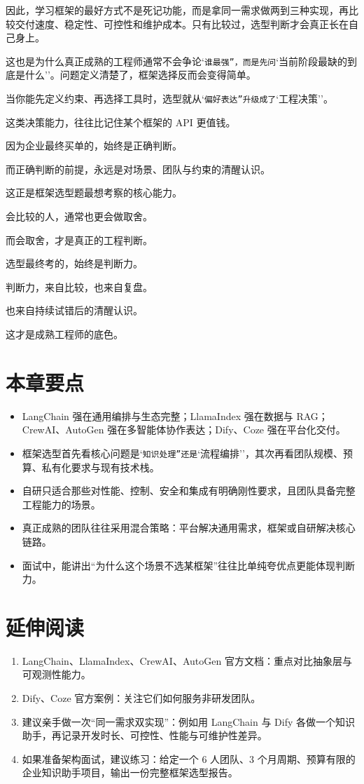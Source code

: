 因此，学习框架的最好方式不是死记功能，而是拿同一需求做两到三种实现，再比较交付速度、稳定性、可控性和维护成本。只有比较过，选型判断才会真正长在自己身上。


这也是为什么真正成熟的工程师通常不会争论`\texttt{谁最强''，而是先问}`当前阶段最缺的到底是什么''。问题定义清楚了，框架选择反而会变得简单。


当你能先定义约束、再选择工具时，选型就从`\texttt{偏好表达''升级成了}`工程决策''。


这类决策能力，往往比记住某个框架的 API 更值钱。


因为企业最终买单的，始终是正确判断。


而正确判断的前提，永远是对场景、团队与约束的清醒认识。


这正是框架选型题最想考察的核心能力。


会比较的人，通常也更会做取舍。


而会取舍，才是真正的工程判断。


选型最终考的，始终是判断力。


判断力，来自比较，也来自复盘。


也来自持续试错后的清醒认识。


这才是成熟工程师的底色。


\section{本章要点}

\begin{itemize}[leftmargin=2em]
\item LangChain 强在通用编排与生态完整；LlamaIndex 强在数据与 RAG；CrewAI、AutoGen 强在多智能体协作表达；Dify、Coze 强在平台化交付。
\item 框架选型首先看核心问题是`\texttt{知识处理''还是}`流程编排''，其次再看团队规模、预算、私有化要求与现有技术栈。
\item 自研只适合那些对性能、控制、安全和集成有明确刚性要求，且团队具备完整工程能力的场景。
\item 真正成熟的团队往往采用混合策略：平台解决通用需求，框架或自研解决核心链路。
\item 面试中，能讲出``为什么这个场景不选某框架''往往比单纯夸优点更能体现判断力。
\end{itemize}

\section{延伸阅读}

\begin{enumerate}[leftmargin=2em]
\item LangChain、LlamaIndex、CrewAI、AutoGen 官方文档：重点对比抽象层与可观测性能力。
\item Dify、Coze 官方案例：关注它们如何服务非研发团队。
\item 建议亲手做一次``同一需求双实现''：例如用 LangChain 与 Dify 各做一个知识助手，再记录开发时长、可控性、性能与可维护性差异。
\item 如果准备架构面试，建议练习：给定一个 6 人团队、3 个月周期、预算有限的企业知识助手项目，输出一份完整框架选型报告。
\end{enumerate}
